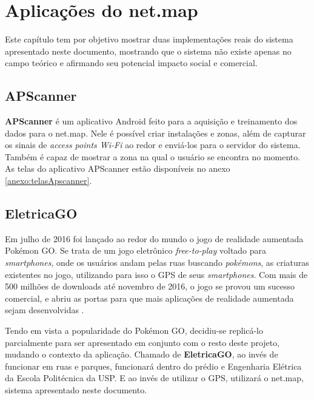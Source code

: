 \chapter{Aplicações do net.map}\label{chp:implementations}

Este capítulo tem por objetivo mostrar duas implementações reais do sistema apresentado neste documento, mostrando que o sistema não existe apenas no campo teórico e afirmando seu potencial impacto social e comercial.

\section{APScanner}

\textbf{APScanner} é um aplicativo Android feito para a aquisição e treinamento dos dados para o net.map. Nele é possível criar instalações e zonas, além de capturar os sinais de \textit{access points Wi-Fi} ao redor e enviá-los para o servidor do sistema. Também é capaz de mostrar a zona na qual o usuário se encontra no momento.
\\
As telas do aplicativo APScanner estão disponíveis no anexo \ref{anexo:telasApscanner}.

\section{EletricaGO}

Em julho de 2016 foi lançado ao redor do mundo o jogo de realidade aumentada Pokémon GO. Se trata de um jogo eletrônico \textit{free-to-play} voltado para \textit{smartphones}, onde os usuários andam pelas ruas buscando \textit{pokémons}, as criaturas existentes no jogo, utilizando para isso o GPS de seus \textit{smartphones}. Com mais de 500 milhões de downloads até novembro de 2016, o jogo se provou um sucesso comercial, e abriu as portas para que mais aplicações de realidade aumentada sejam desenvolvidas \cite{dapokemon}.
\par
Tendo em vista a popularidade do Pokémon GO, decidiu-se replicá-lo parcialmente para ser apresentado em conjunto com o resto deste projeto, mudando o contexto da aplicação. Chamado de \textbf{EletricaGO}, ao invés de funcionar em ruas e parques, funcionará dentro do prédio e Engenharia Elétrica da Escola Politécnica da USP. E ao invés de utilizar o GPS, utilizará o net.map, sistema apresentado neste documento.